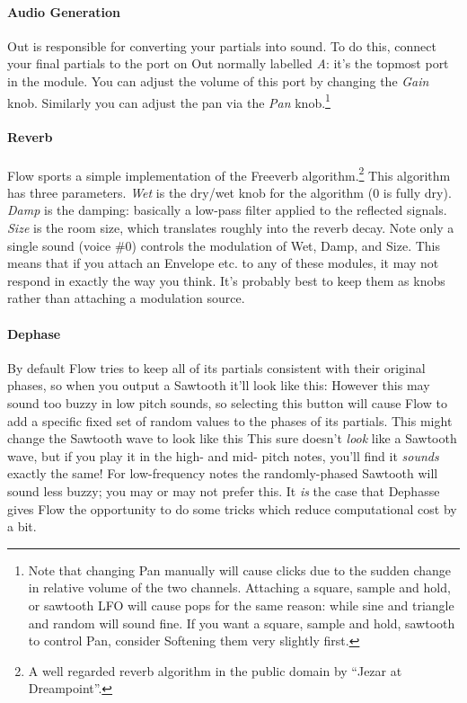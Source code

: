 \documentclass{article}
\begin{document}
\paragraph{Audio Generation}  Out is responsible for converting your partials into sound.  To do this, connect your final partials to the port on Out normally labelled {\it A}: it's the topmost port in the module.  You can adjust the volume of this port by changing the {\it Gain} knob.  Similarly you can adjust the pan via the {\it Pan} knob.\footnote{Note that changing Pan manually will cause clicks due to the sudden change in relative volume of the two channels.  Attaching a square, sample and hold, or sawtooth LFO will cause pops for the same reason: while sine and triangle and random will sound fine.  If you want a square, sample and hold,  sawtooth to control Pan, consider Softening them very slightly first.}

\paragraph{Reverb} Flow sports a simple implementation of the Freeverb algorithm.\footnote{A well regarded reverb algorithm in the public domain by ``Jezar at Dreampoint''.}  This algorithm has three parameters.  {\it Wet} is the dry/wet knob for the algorithm (0 is fully dry).  {\it Damp} is the damping: basically a low-pass filter applied to the reflected signals.  {\it Size} is the room size, which translates roughly into the reverb decay.  Note only a single sound (voice \#0) controls the modulation of Wet, Damp, and Size.  This means that if you attach an Envelope etc. to any of these modules, it may not respond in exactly the way you think.  It's probably best to keep them as knobs rather than attaching a modulation source.

\paragraph{Dephase} By default Flow tries to keep all of its partials consistent with their original phases, so when you output a Sawtooth it'll look like this:  \quad However this may sound too buzzy in low pitch sounds, so selecting this button will cause Flow to add a specific fixed set of random values to the phases of its partials.  This might change the Sawtooth wave to look like this \quad This sure doesn't {\it look} like a Sawtooth wave, but if you play it in the high- and mid- pitch notes, you'll find it {\it sounds} exactly the same!  For low-frequency notes the randomly-phased Sawtooth will sound less buzzy; you may or may not prefer this.  It {\it is} the case that Dephasse gives Flow the opportunity to do some tricks which reduce computational cost by a bit.
\end{document}
